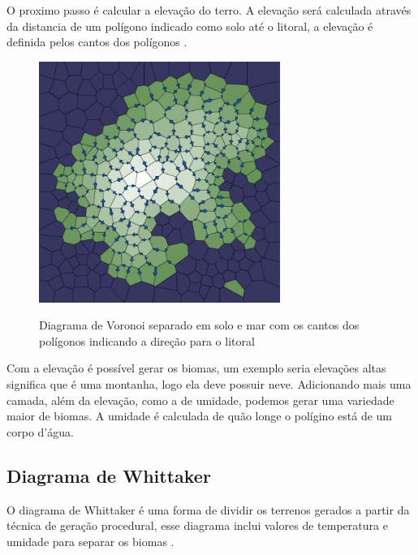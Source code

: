 O proximo passo é calcular a elevação do terro. A elevação será calculada através da distancia de um polígono indicado como solo até o litoral, a elevação é definida pelos cantos dos polígonos \cite{amitp2010}. 

\begin{figure}[H]
	\caption{Diagrama de Voronoi separado em solo e mar com os cantos dos polígonos indicando a direção para o litoral}
	\centering
	\includegraphics[width=0.7\textwidth]{figures/downslopes.png}
	\label{fig:downslopes}
\end{figure}

Com a elevação é possível gerar os biomas, um exemplo seria elevações altas significa que é uma montanha, logo ela deve possuir neve. Adicionando mais uma camada, além da elevação, como a de umidade, podemos gerar uma variedade maior de biomas. A umidade é calculada de quão longe o polígino está de um corpo d'água.

\subsection*{Diagrama de Whittaker}

O diagrama de Whittaker é uma forma de dividir os terrenos gerados a partir da técnica de geração procedural, esse diagrama inclui valores de temperatura e umidade para separar os biomas \cite{wikidotwhittakerdiagram}.

